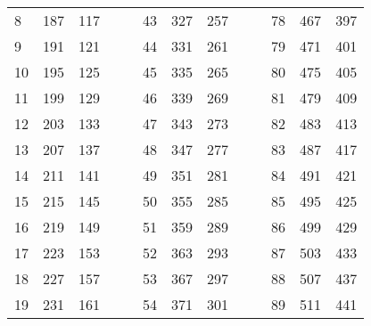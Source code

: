 \begin{table}[!h]
\begin{tabular}{|l|l|l|ll|l|l|l|lllll}
		8 & 187 & 117 &  &  & 43 & 327 & 257 &  & \multicolumn{1}{l|}{} & \multicolumn{1}{l|}{78} & \multicolumn{1}{l|}{467} & \multicolumn{1}{l|}{397} \\ \cline{1-3} \cline{6-8} \cline{11-13} 
		9 & 191 & 121 &  &  & 44 & 331 & 261 &  & \multicolumn{1}{l|}{} & \multicolumn{1}{l|}{79} & \multicolumn{1}{l|}{471} & \multicolumn{1}{l|}{401} \\ \cline{1-3} \cline{6-8} \cline{11-13} 
		10 & 195 & 125 &  &  & 45 & 335 & 265 &  & \multicolumn{1}{l|}{} & \multicolumn{1}{l|}{80} & \multicolumn{1}{l|}{475} & \multicolumn{1}{l|}{405} \\ \cline{1-3} \cline{6-8} \cline{11-13} 
		11 & 199 & 129 &  &  & 46 & 339 & 269 &  & \multicolumn{1}{l|}{} & \multicolumn{1}{l|}{81} & \multicolumn{1}{l|}{479} & \multicolumn{1}{l|}{409} \\ \cline{1-3} \cline{6-8} \cline{11-13} 
		12 & 203 & 133 &  &  & 47 & 343 & 273 &  & \multicolumn{1}{l|}{} & \multicolumn{1}{l|}{82} & \multicolumn{1}{l|}{483} & \multicolumn{1}{l|}{413} \\ \cline{1-3} \cline{6-8} \cline{11-13} 
		13 & 207 & 137 &  &  & 48 & 347 & 277 &  & \multicolumn{1}{l|}{} & \multicolumn{1}{l|}{83} & \multicolumn{1}{l|}{487} & \multicolumn{1}{l|}{417} \\ \cline{1-3} \cline{6-8} \cline{11-13} 
		14 & 211 & 141 &  &  & 49 & 351 & 281 &  & \multicolumn{1}{l|}{} & \multicolumn{1}{l|}{84} & \multicolumn{1}{l|}{491} & \multicolumn{1}{l|}{421} \\ \cline{1-3} \cline{6-8} \cline{11-13} 
		15 & 215 & 145 &  &  & 50 & 355 & 285 &  & \multicolumn{1}{l|}{} & \multicolumn{1}{l|}{85} & \multicolumn{1}{l|}{495} & \multicolumn{1}{l|}{425} \\ \cline{1-3} \cline{6-8} \cline{11-13} 
		16 & 219 & 149 &  &  & 51 & 359 & 289 &  & \multicolumn{1}{l|}{} & \multicolumn{1}{l|}{86} & \multicolumn{1}{l|}{499} & \multicolumn{1}{l|}{429} \\ \cline{1-3} \cline{6-8} \cline{11-13} 
		17 & 223 & 153 &  &  & 52 & 363 & 293 &  & \multicolumn{1}{l|}{} & \multicolumn{1}{l|}{87} & \multicolumn{1}{l|}{503} & \multicolumn{1}{l|}{433} \\ \cline{1-3} \cline{6-8} \cline{11-13} 
		18 & 227 & 157 &  &  & 53 & 367 & 297 &  & \multicolumn{1}{l|}{} & \multicolumn{1}{l|}{88} & \multicolumn{1}{l|}{507} & \multicolumn{1}{l|}{437} \\ \cline{1-3} \cline{6-8} \cline{11-13} 
		19 & 231 & 161 &  &  & 54 & 371 & 301 &  & \multicolumn{1}{l|}{} & \multicolumn{1}{l|}{89} & \multicolumn{1}{l|}{511} & \multicolumn{1}{l|}{441} \\ \cline{1-3} \cline{6-8} \cline{11-13} 

\end{tabular}
\end{table}
